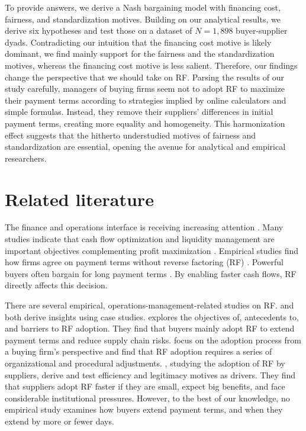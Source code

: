 \documentclass[a4paper,11pt]{article}
\renewcommand{\~}[1]{\tilde{#1}}
\renewcommand{\-}[1]{\overline{#1}}
\begin{document}
To provide answers, we derive a Nash bargaining model with financing cost, fairness, and standardization motives. Building on our analytical results, we derive six hypotheses and 
 test those on a dataset of $N=1,898$ buyer-supplier dyads. Contradicting our intuition that the financing cost motive is likely dominant, we find mainly support for the fairness and the standardization motives, whereas the financing cost motive is less salient. Therefore, our findings change the perspective that we should take on RF. Parsing the results of our study carefully, managers of buying firms seem not to adopt RF to maximize their payment terms according to strategies implied by online calculators and simple formulas. Instead, they remove their suppliers' differences in initial payment terms, creating more equality and homogeneity. This harmonization effect suggests that the hitherto understudied motives of fairness and standardization are essential, opening the avenue for analytical and empirical researchers.%

\section{Related literature}\label{sec:literature}
The finance and operations interface is receiving increasing attention \citep{Babich2004,Kouvelis2012,Zhao2015}. Many studies indicate that cash flow optimization and liquidity management are important objectives complementing profit maximization \citep{Boissay2013, Filbeck2016, Kouvelis2012}. Empirical studies find how firms agree on payment terms without reverse factoring (RF) \citep{Summers2002,Fabbri2016}. Powerful buyers often bargain for long payment terms \citep{Fabbri2016}. By enabling faster cash flows, RF directly affects this decision. 
 
There are several empirical, operations-management-related studies on RF. \citet{Liebl2016} and \citet{Wuttke2013} both derive insights using case studies. \citet{Liebl2016} explores the objectives of, antecedents to, and barriers to RF adoption. They find that buyers mainly adopt RF to extend payment terms and reduce supply chain risks. \citet{Wuttke2013} focus on the adoption process from a buying firm's perspective and find that RF adoption requires a series of organizational and procedural adjustments. \citet{Wuttke2019}, studying the adoption of RF by suppliers, derive and test efficiency and legitimacy motives as drivers. They find that suppliers adopt RF faster if they are small, expect big benefits, and face considerable institutional pressures. However, to the best of our knowledge, no empirical study examines how buyers extend payment terms, and when they extend by more or fewer days. 
\end{document}
